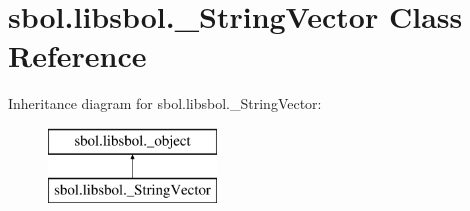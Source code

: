 \hypertarget{classsbol_1_1libsbol_1_1___string_vector}{}\section{sbol.\+libsbol.\+\_\+\+String\+Vector Class Reference}
\label{classsbol_1_1libsbol_1_1___string_vector}
Inheritance diagram for sbol.\+libsbol.\+\_\+\+String\+Vector\+:\begin{figure}[H]
\begin{center}
\leavevmode
\includegraphics[height=2.000000cm]{classsbol_1_1libsbol_1_1___string_vector}
\end{center}
\end{figure}
